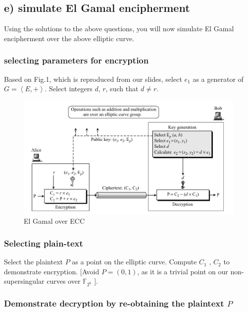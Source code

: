 \documentclass[a4paper,11pt]{exam}
\begin{document}
\subsection{e) simulate El Gamal encipherment}
\label{sec:org8895308}
Using the solutions to the above questions, you will now simulate El Gamal encipherment over the above elliptic curve.

\subsubsection{selecting parameters for encryption}
\label{sec:orgec72a22}
Based on Fig.1, which is reproduced from our slides, select \(e_1\) as a generator of \(G = \left<E, +\right>\). Select integers \(d\), \(r\), such that \(d \ne r\).

\begin{center}
\begin{figure}[h]
    \centering
    \includegraphics[width=16cm]{./images/fig1_hw3.png}
    \caption{El Gamal over ECC}
    \label{fig:fig1_hw3}
  \end{figure}
\end{center}

\subsubsection{Selecting plain-text}
\label{sec:org14954c4}
Select the plaintext \(P\) as a point on the elliptic curve. Compute \(C_1\) , \(C_2\) to demonstrate encryption. [Avoid \(P = (0, 1)\), as it is a trivial point on our non-supersingular curves over \(\mathbb{F}_{2^k}\) ].

\subsubsection{Demonstrate decryption by re-obtaining the plaintext \(P\)}
\label{sec:org650e759}
\end{document}
